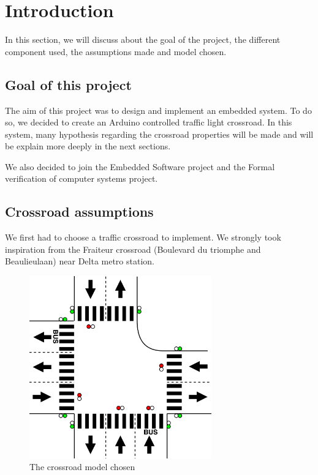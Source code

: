 \section{Introduction}
In this section, we will discuss about the goal of the project, the different component used, the assumptions made and model chosen.

\subsection{Goal of this project}
The aim of this project was to design and implement an embedded system. To do so, we decided to create an Arduino controlled traffic light crossroad. In this system, many hypothesis regarding the crossroad properties will be made and will be explain more deeply in the next sections.

We also decided to join the Embedded Software project and the Formal verification of computer systems project.

\subsection{Crossroad assumptions}

We first had to choose a traffic crossroad to implement. We strongly took inspiration from the Fraiteur crossroad (Boulevard du triomphe and Beaulieulaan) near Delta metro station.

\begin{figure}[!ht] \label{fig:crossroad}
  \centering
    \includegraphics[width=0.7\textwidth]{picture/crossroad.png}
    \caption{The crossroad model chosen}
\end{figure}

